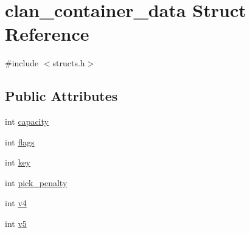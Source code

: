 \hypertarget{structclan__container__data}{\section{clan\-\_\-container\-\_\-data Struct Reference}
\label{structclan__container__data}
}


{\ttfamily \#include $<$structs.\-h$>$}

\subsection*{Public Attributes}
\begin{DoxyCompactItemize}
\item 
int \hyperlink{structclan__container__data_ae36166a1a6b7f850f69228cf7309aaf5}{capacity}
\item 
int \hyperlink{structclan__container__data_a68c2f139e7f2c0358c45e0a2235aebb0}{flags}
\item 
int \hyperlink{structclan__container__data_adc0d9496089fa8fb750b8ae2cc4ca9ae}{key}
\item 
int \hyperlink{structclan__container__data_a218ac8d8fc4d28fbf4c9cf963efce513}{pick\-\_\-penalty}
\item 
int \hyperlink{structclan__container__data_a61e6ca37b0ab1e631959ce2dc627676d}{v4}
\item 
int \hyperlink{structclan__container__data_a50443f46656539c044890e01ede56c0d}{v5}
\end{DoxyCompactItemize}


